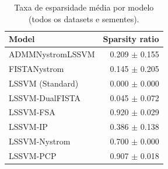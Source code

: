 \begin{table}[ht]
  \centering
  \caption{Taxa de esparsidade média por modelo (todos os datasets e sementes).}
  \label{tab:sparsity}
  \begin{tabular}{lr}
    \toprule
    Model & Sparsity ratio \\
    \midrule
ADMMNystromLSSVM & 0.209 $\pm$ 0.155 \\
FISTANystrom & 0.145 $\pm$ 0.205 \\
LSSVM (Standard) & 0.000 $\pm$ 0.000 \\
LSSVM-DualFISTA & 0.045 $\pm$ 0.072 \\
LSSVM-FSA & 0.920 $\pm$ 0.029 \\
LSSVM-IP & 0.386 $\pm$ 0.138 \\
LSSVM-Nystrom & 0.700 $\pm$ 0.000 \\
LSSVM-PCP & 0.907 $\pm$ 0.018 \\
    \bottomrule
  \end{tabular}
\end{table}